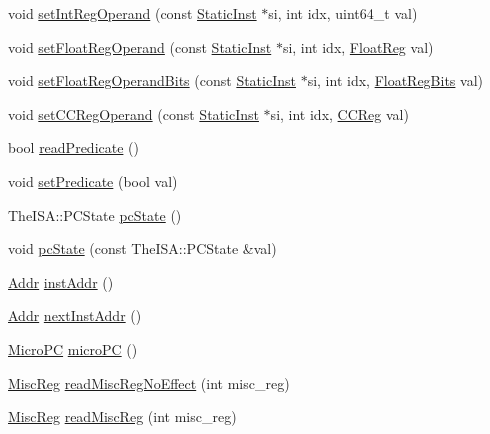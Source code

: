 \begin{DoxyCompactItemize}
\item 
void \hyperlink{classBaseSimpleCPU_a654e99f2be7cd298378462ce9651bb44}{setIntRegOperand} (const \hyperlink{classStaticInst}{StaticInst} $\ast$si, int idx, uint64\_\-t val)
\item 
void \hyperlink{classBaseSimpleCPU_addc8b4b6511725bf8ff48bd09ef22892}{setFloatRegOperand} (const \hyperlink{classStaticInst}{StaticInst} $\ast$si, int idx, \hyperlink{classBaseSimpleCPU_a75484259f1855aabc8d74c6eb1cfe186}{FloatReg} val)
\item 
void \hyperlink{classBaseSimpleCPU_a80a516966713c873cf964af7538dbd37}{setFloatRegOperandBits} (const \hyperlink{classStaticInst}{StaticInst} $\ast$si, int idx, \hyperlink{classBaseSimpleCPU_aab5eeae86499f9bfe15ef79360eccc64}{FloatRegBits} val)
\item 
void \hyperlink{classBaseSimpleCPU_a859133f9c66c7b72cb02ff58e8385b52}{setCCRegOperand} (const \hyperlink{classStaticInst}{StaticInst} $\ast$si, int idx, \hyperlink{classBaseSimpleCPU_a0c9de550a32808e6a25b54b6c791d5ab}{CCReg} val)
\item 
bool \hyperlink{classBaseSimpleCPU_a254cecc48d457ea298b08a8bb009f9cf}{readPredicate} ()
\item 
void \hyperlink{classBaseSimpleCPU_a137a8c6cced89c2ff8387900439436b4}{setPredicate} (bool val)
\item 
TheISA::PCState \hyperlink{classBaseSimpleCPU_a827fb3454585cf4c620f4fd341966317}{pcState} ()
\item 
void \hyperlink{classBaseSimpleCPU_a5e9cfc754c9ef9b7db875ce89871944e}{pcState} (const TheISA::PCState \&val)
\item 
\hyperlink{base_2types_8hh_af1bb03d6a4ee096394a6749f0a169232}{Addr} \hyperlink{classBaseSimpleCPU_a53c92716db281ae16ffb693c6d7803c7}{instAddr} ()
\item 
\hyperlink{base_2types_8hh_af1bb03d6a4ee096394a6749f0a169232}{Addr} \hyperlink{classBaseSimpleCPU_aceec6e28772f91b3cc921c0e3927b0c2}{nextInstAddr} ()
\item 
\hyperlink{base_2types_8hh_adfb4d8b20c5abc8be73dd367b16f2d57}{MicroPC} \hyperlink{classBaseSimpleCPU_a1a21696f33a7d38f251687ae0b5e9718}{microPC} ()
\item 
\hyperlink{classBaseSimpleCPU_aaf5f073a387db0556d1db4bcc45428bc}{MiscReg} \hyperlink{classBaseSimpleCPU_a7b5ac6af9c2c19d7c1b442b8a3aebbc6}{readMiscRegNoEffect} (int misc\_\-reg)
\item 
\hyperlink{classBaseSimpleCPU_aaf5f073a387db0556d1db4bcc45428bc}{MiscReg} \hyperlink{classBaseSimpleCPU_a5a8c6c487e8da143d26188258b04f1cc}{readMiscReg} (int misc\_\-reg)

\end{DoxyCompactItemize}
